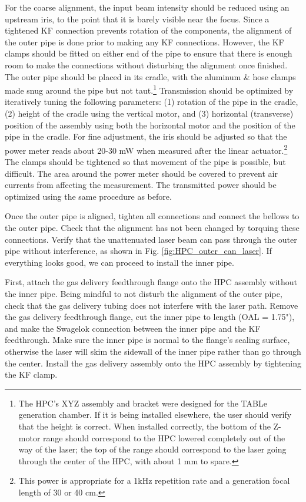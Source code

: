 For the coarse alignment, the input beam intensity should be reduced using an upstream iris, to the point that it is barely visible near the focus. Since a tightened KF connection prevents rotation of the components, the alignment of the outer pipe is done prior to making any KF connections. However, the KF clamps should be fitted on either end of the pipe to ensure that there is enough room to make the connections without disturbing the alignment once finished. The outer pipe should be placed in its cradle, with the aluminum \& hose clamps made snug around the pipe but not taut.\footnote{The HPC's XYZ assembly and bracket were designed for the TABLe generation chamber. If it is being installed elsewhere, the user should verify that the height is correct. When installed correctly, the bottom of the Z-motor range should correspond to the HPC lowered completely out of the way of the laser; the top of the range should correspond to the laser going through the center of the HPC, with about 1 mm to spare.} Transmission should be optimized by iteratively tuning the following parameters: (1) rotation of the pipe in the cradle, (2) height of the cradle using the vertical motor, and (3) horizontal (transverse) position of the assembly using both the horizontal motor and the position of the pipe in the cradle. For fine adjustment, the iris should be adjusted so that the power meter reads about 20-30 mW when measured after the linear actuator.\footnote{This power is appropriate for a 1kHz repetition rate and a generation focal length of 30 or 40 cm.} The clamps should be tightened so that movement of the pipe is possible, but difficult. The area around the power meter should be covered to prevent air currents from affecting the measurement. The transmitted power should be optimized using the same procedure as before.

Once the outer pipe is aligned, tighten all connections and connect the bellows to the outer pipe. Check that the alignment has not been changed by torquing these connections. Verify that the unattenuated laser beam can pass through the outer pipe without interference, as shown in Fig. \ref{fig:HPC_outer_can_laser}. If everything looks good, we can proceed to install the inner pipe.

First, attach the gas delivery feedthrough flange onto the HPC assembly without the inner pipe. Being mindful to not disturb the alignment of the outer pipe, check that the gas delivery tubing does not interfere with the laser path. Remove the gas delivery feedthrough flange, cut the inner pipe to length (OAL = 1.75"), and make the Swagelok connection between the inner pipe and the KF feedthrough. Make sure the inner pipe is normal to the flange's sealing surface, otherwise the laser will skim the sidewall of the inner pipe rather than go through the center. Install the gas delivery assembly onto the HPC assembly by tightening the KF clamp.

